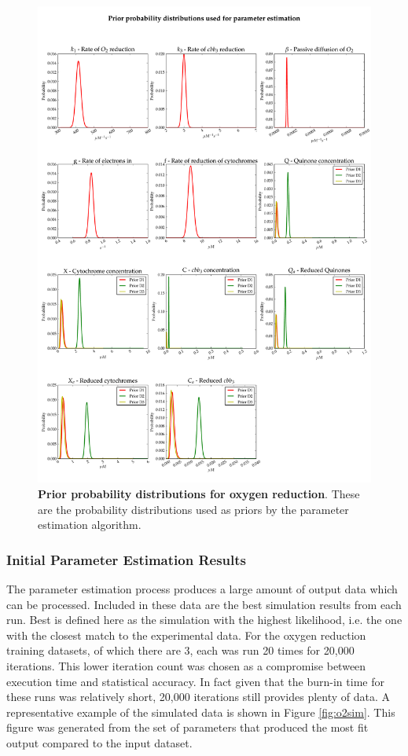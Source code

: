 \begin{figure}[tbp]
 \centering
 \includegraphics[width=15cm, trim=0cm 0cm 0cm 0cm]{./05-oxygenreduction/data/priors1.pdf}
 \caption[Prior probability distributions for oxygen reduction]{{\bf Prior probability distributions for oxygen reduction}. These are the probability distributions used as priors by the parameter estimation algorithm.
 \label{fig:oxypriors}}
\end{figure}

\subsubsection{Initial Parameter Estimation Results}
The parameter estimation process produces a large amount of output data which can be processed. Included in these data are the best simulation results from each run. Best is defined here as the simulation with the highest likelihood, i.e. the one with the closest match to the experimental data. For the oxygen reduction training datasets, of which there are 3, each was run 20 times for 20,000 iterations. This lower iteration count was chosen as a compromise between execution time and statistical accuracy. In fact given that the burn-in time for these runs was relatively short, 20,000 iterations still provides plenty of data. A representative example of the simulated data is shown in Figure \ref{fig:o2sim}. This figure was generated from the set of parameters that produced the most fit output compared to the input dataset.

